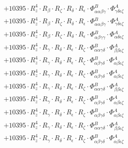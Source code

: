 \documentclass{article}
\begin{document}
\begin{subequations}
\begin{gather}
\begin{array}{c}
 \\[0.2em] 		 + 10395 \cdot R_{z}^{4} \cdot R_{\beta{}} \cdot R_{\zeta{}} \cdot R_{\delta{}} \cdot R_{\epsilon{}} \cdot \Phi{}^{B}_{\alpha{}\alpha{}\beta{}\gamma{}} \cdot \Phi{}^{A}_{\gamma{}\delta{}\epsilon{}\zeta{}} 
 \\[0.2em] 		 + 10395 \cdot R_{z}^{4} \cdot R_{\beta{}} \cdot R_{\zeta{}} \cdot R_{\delta{}} \cdot R_{\epsilon{}} \cdot \Phi{}^{B}_{\alpha{}\alpha{}\beta{}\gamma{}} \cdot \Phi{}^{A}_{\gamma{}\delta{}\epsilon{}\zeta{}} 
 \\[0.2em] 		 + 10395 \cdot R_{z}^{4} \cdot R_{\beta{}} \cdot R_{\zeta{}} \cdot R_{\delta{}} \cdot R_{\epsilon{}} \cdot \Phi{}^{B}_{\alpha{}\beta{}\gamma{}\gamma{}} \cdot \Phi{}^{A}_{\alpha{}\delta{}\epsilon{}\zeta{}} 
 \\[0.2em] 		 + 10395 \cdot R_{z}^{4} \cdot R_{\gamma{}} \cdot R_{\delta{}} \cdot R_{\epsilon{}} \cdot R_{\zeta{}} \cdot \Phi{}^{B}_{\alpha{}\alpha{}\gamma{}\delta{}} \cdot \Phi{}^{A}_{\beta{}\beta{}\epsilon{}\zeta{}} 
 \\[0.2em] 		 + 10395 \cdot R_{z}^{4} \cdot R_{\gamma{}} \cdot R_{\delta{}} \cdot R_{\epsilon{}} \cdot R_{\zeta{}} \cdot \Phi{}^{B}_{\alpha{}\beta{}\gamma{}\delta{}} \cdot \Phi{}^{A}_{\alpha{}\beta{}\epsilon{}\zeta{}} 
 \\[0.2em] 		 + 10395 \cdot R_{z}^{4} \cdot R_{\gamma{}} \cdot R_{\delta{}} \cdot R_{\epsilon{}} \cdot R_{\zeta{}} \cdot \Phi{}^{B}_{\alpha{}\beta{}\gamma{}\delta{}} \cdot \Phi{}^{A}_{\alpha{}\beta{}\epsilon{}\zeta{}} 
 \\[0.2em] 		 + 10395 \cdot R_{z}^{4} \cdot R_{\gamma{}} \cdot R_{\delta{}} \cdot R_{\epsilon{}} \cdot R_{\zeta{}} \cdot \Phi{}^{B}_{\alpha{}\alpha{}\gamma{}\delta{}} \cdot \Phi{}^{A}_{\beta{}\beta{}\epsilon{}\zeta{}} 
 \\[0.2em] 		 + 10395 \cdot R_{z}^{4} \cdot R_{\gamma{}} \cdot R_{\delta{}} \cdot R_{\epsilon{}} \cdot R_{\zeta{}} \cdot \Phi{}^{B}_{\alpha{}\beta{}\gamma{}\delta{}} \cdot \Phi{}^{A}_{\alpha{}\beta{}\epsilon{}\zeta{}} 
 \\[0.2em] 		 + 10395 \cdot R_{z}^{4} \cdot R_{\gamma{}} \cdot R_{\delta{}} \cdot R_{\epsilon{}} \cdot R_{\zeta{}} \cdot \Phi{}^{B}_{\alpha{}\beta{}\gamma{}\delta{}} \cdot \Phi{}^{A}_{\alpha{}\beta{}\epsilon{}\zeta{}} 
 \\[0.2em] 		 + 10395 \cdot R_{z}^{4} \cdot R_{\gamma{}} \cdot R_{\delta{}} \cdot R_{\epsilon{}} \cdot R_{\zeta{}} \cdot \Phi{}^{B}_{\alpha{}\alpha{}\gamma{}\delta{}} \cdot \Phi{}^{A}_{\beta{}\beta{}\epsilon{}\zeta{}} 
 \\[0.2em] 		 + 10395 \cdot R_{z}^{4} \cdot R_{\gamma{}} \cdot R_{\delta{}} \cdot R_{\epsilon{}} \cdot R_{\zeta{}} \cdot \Phi{}^{B}_{\alpha{}\beta{}\gamma{}\delta{}} \cdot \Phi{}^{A}_{\alpha{}\beta{}\epsilon{}\zeta{}} 

\end{array}
\end{gather}
\end{subequations}
\end{document}
